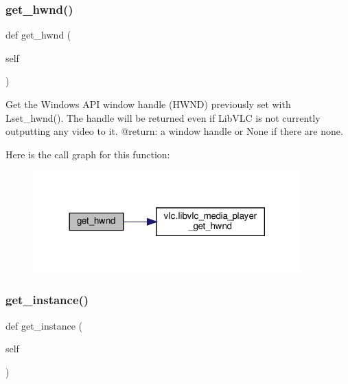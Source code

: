 \subsubsection{\texorpdfstring{get\+\_\+hwnd()}{get\_hwnd()}}
{\footnotesize\ttfamily def get\+\_\+hwnd (\begin{DoxyParamCaption}\item[{}]{self }\end{DoxyParamCaption})}

\begin{DoxyVerb}Get the Windows API window handle (HWND) previously set with
L{set_hwnd}(). The handle will be returned even if LibVLC
is not currently outputting any video to it.
@return: a window handle or None if there are none.
\end{DoxyVerb}
 Here is the call graph for this function\+:
\nopagebreak
\begin{figure}[H]
\begin{center}
\leavevmode
\includegraphics[width=293pt]{classvlc_1_1_media_player_af545adff837a9f6c8bfd31b70854cde7_cgraph}
\end{center}
\end{figure}
\mbox{\label{classvlc_1_1_media_player_a56c15bafa43c856366863fc07fc4021f}} 
\subsubsection{\texorpdfstring{get\+\_\+instance()}{get\_instance()}}
{\footnotesize\ttfamily def get\+\_\+instance (\begin{DoxyParamCaption}\item[{}]{self }\end{DoxyParamCaption})}

